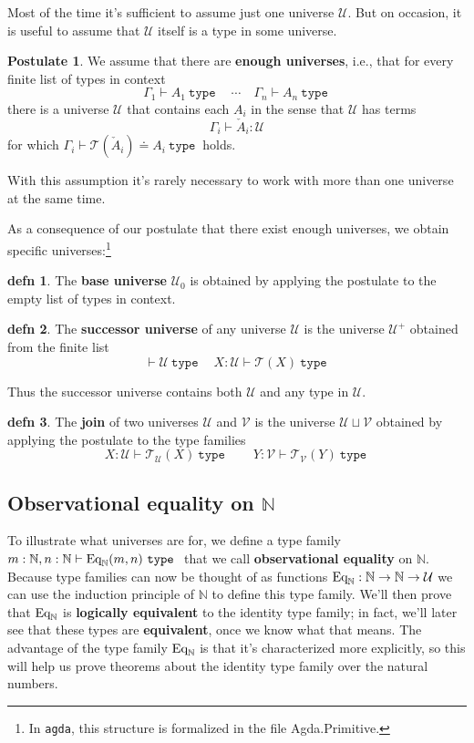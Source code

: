 \documentclass{amsart}
\theoremstyle{theorem}
\theoremstyle{definition}
\newtheorem*{defn}{defn}
\newtheorem*{post}{Postulate}
\theoremstyle{remark}
\newcommand{\0}{\mathbbe{0}}
\newcommand{\1}{\mathbbe{1}}
\newcommand{\2}{\mathbbe{2}}
\newcommand{\3}{\mathbbe{3}}
\newcommand{\4}{\mathbbe{4}}
\newcommand{\univ}{{~\texttt{type}~}}
\newcommand{\bN}{{\mathbb{N}}}
\newcommand{\UU}{{\mathcal{U}}}
\newcommand{\sT}{\mathcal{T}}
\newcommand{\Eq}{\textup{\text{Eq}}}
\begin{document}
Most of the time it's sufficient to assume just one universe $\UU$. But on occasion, it is useful to assume that $\UU$ itself is a type in some universe. 

\begin{post} We assume that there are \textbf{enough universes}, i.e., that for every finite list of types in context
\[ \Gamma_1 \vdash A_1 \univ \quad \cdots \quad \Gamma_n \vdash A_n \univ\]
there is a universe $\UU$ that contains each $A_i$ in the sense that $\UU$ has terms
\[ \Gamma_i \vdash \check{A}_i : \UU\] for which $\Gamma_i \vdash \sT(\check{A}_i) \doteq A_i \univ$ holds. 
\end{post}

With this assumption it's rarely necessary to work with more than one universe at the same time. 

As a consequence of our postulate that there exist enough universes, we obtain specific universes:\footnote{In \texttt{agda}, this structure is formalized in the file Agda.Primitive.}

\begin{defn} The \textbf{base universe} $\UU_0$ is obtained by applying the postulate to the empty list of types in context.
\end{defn}

\begin{defn} The \textbf{successor universe} of any universe $\UU$ is the universe $\UU^+$ obtained from the finite list
\[ \vdash \UU \univ \quad X: \UU \vdash \sT(X) \univ\]
\end{defn}
Thus the successor universe contains both $\UU$ and any type in $\UU$. 

\begin{defn} The \textbf{join} of two universes $\UU$ and $\mathcal{V}$ is the universe $\UU \sqcup \mathcal{V}$ obtained by applying the postulate to the type families
\[ X : \UU \vdash \sT_\UU(X) \univ \qquad Y : \mathcal{V} \vdash \sT_{\mathcal{V}}(Y) \univ\]
\end{defn}

\subsection*{Observational equality on \texorpdfstring{$\bN$}{N}}

To illustrate what universes are for, we define a type family $m : \bN, n : \bN \vdash \Eq_\bN(m,n) \univ$ that we call \textbf{observational equality} on $\bN$. Because type families can now be thought of as functions $\Eq_\bN : \bN \to \bN \to \UU$ we can use the induction principle of $\bN$ to define this type family.  We'll then prove that $\Eq_\bN$ is \textbf{logically equivalent} to the identity type family; in fact, we'll later see that these types are \textbf{equivalent}, once we know what that means. The advantage of the type family $\Eq_\bN$ is that it's characterized more explicitly, so this will help us prove theorems about the identity type family over the natural numbers.
\end{document}

